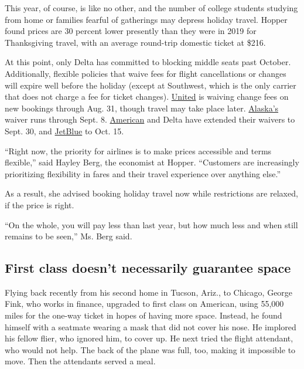This year, of course, is like no other, and the number of college
students studying from home or families fearful of gatherings may
depress holiday travel. Hopper found prices are 30 percent lower
presently than they were in 2019 for Thanksgiving travel, with an
average round-trip domestic ticket at \$216.

At this point, only Delta has committed to blocking middle seats past
October. Additionally, flexible policies that waive fees for flight
cancellations or changes will expire well before the holiday (except at
Southwest, which is the only carrier that does not charge a fee for
ticket changes).
\href{https://www.united.com/ual/en/us/fly/travel/notices.html}{United}
is waiving change fees on new bookings through Aug. 31, though travel
may take place later.
\href{https://www.alaskaair.com/content/advisories/coronavirus?int=_AS_HomePage_AdvisoryBR_L1\%7C\%7C2020_CV_AW\%7C\%7C-prodID:Awareness\#weve-got-you-covered}{Alaska's}
waiver runs through Sept. 8.
\href{https://www.aa.com/i18n/travel-info/coronavirus-updates.jsp}{American}
and Delta have extended their waivers to Sept. 30, and
\href{https://www.jetblue.com/travel-alerts}{JetBlue} to Oct. 15.

``Right now, the priority for airlines is to make prices accessible and
terms flexible,'' said Hayley Berg, the economist at Hopper. ``Customers
are increasingly prioritizing flexibility in fares and their travel
experience over anything else.''

As a result, she advised booking holiday travel now while restrictions
are relaxed, if the price is right.

``On the whole, you will pay less than last year, but how much less and
when still remains to be seen,'' Ms. Berg said.

\hypertarget{first-class-doesnt-necessarily-guarantee-space}{%
\subsection{First class doesn't necessarily guarantee
space}\label{first-class-doesnt-necessarily-guarantee-space}}

Flying back recently from his second home in Tucson, Ariz., to Chicago,
George Fink, who works in finance, upgraded to first class on American,
using 55,000 miles for the one-way ticket in hopes of having more space.
Instead, he found himself with a seatmate wearing a mask that did not
cover his nose. He implored his fellow flier, who ignored him, to cover
up. He next tried the flight attendant, who would not help. The back of
the plane was full, too, making it impossible to move. Then the
attendants served a meal.

